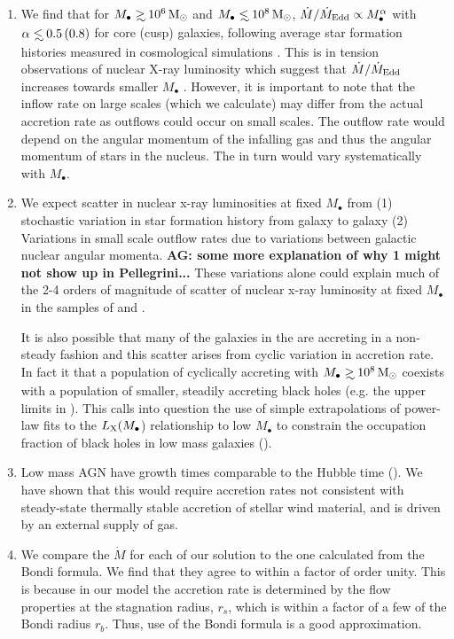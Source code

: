 \documentclass[usenatbib,fleqn]{mn2e}
\newcommand{\Mdot}{\dot{M}}
\newcommand{\eddr}{\dot{M}/\dot{M}_{\rm Edd}}
\newcommand\lsim{\mathrel{\rlap{\lower4pt\hbox{\hskip1pt$\sim$}}
    \raise1pt\hbox{$<$}}}
\newcommand\gsim{\mathrel{\rlap{\lower4pt\hbox{\hskip1pt$\sim$}}
    \raise1pt\hbox{$>$}}}
\newcommand{\rs}{r_s}
\newcommand{\rb}{r_b}
\newcommand{\Mbh}[1][]{M_{\bullet#1}}
\begin{document}
\begin{enumerate}
  \item We find that for $\Mbh\gsim 10^6 \Msun$ and $\Mbh\lsim 10^8
    \Msun$, $\eddr \propto \Mbh^{\alpha}$ with $\alpha\lsim
    0.5 \, (0.8)$ for core (cusp) galaxies, 
    following average star formation histories measured in
    cosmological simulations \citep{MosterNaab+:2013a}. This is in
    tension observations of nuclear X-ray luminosity which suggest
    that $\eddr$ increases towards smaller $\Mbh$
    \citep{Miller+15}. However, it is important to note that the
    inflow rate on large scales (which we calculate) may differ from
    the actual accretion rate as outflows could occur on small
    scales. The outflow rate would depend on the angular momentum of
    the infalling gas and thus the angular momentum of stars in the
    nucleus. The in turn would vary systematically with $\Mbh$.
  \item We expect scatter in nuclear x-ray luminosities at
    fixed $\Mbh$ from (1) stochastic variation in star formation
    history from galaxy to galaxy (2) Variations in small scale outflow
    rates due to variations between galactic nuclear angular
    momenta. {\bf AG: some more explanation of why 1 might not show up
    in Pellegrini...}
    These variations alone could explain much of the 2-4 orders of
    magnitude of scatter of nuclear x-ray luminosity at fixed $\Mbh$ 
    in the samples of \citet{Miller+15} and \citet{Pellegrini:2010a}.
    
    It is also possible that many of the galaxies in the
    \citet{Miller+15} are accreting in a non-steady fashion and this
    scatter arises from cyclic variation in accretion rate. In fact it
    that a population of cyclically accreting with $\Mbh\gsim 10^{8}
    \Msun$ coexists with a population of smaller, steadily accreting
    black holes (e.g. the upper limits in \citet{Miller+15}).  This
    calls into question the use of simple extrapolations of power-law
    fits to the $L_{\rm X}(M_{\bullet}$) relationship to low $M_{\bullet}$
    to constrain the occupation fraction of black holes in low mass
    galaxies (\citealt{Miller+15}).
  \item Low mass AGN have growth times comparable to the Hubble time
    (\citet{Heckman+04}). We have shown that this would require accretion
    rates not consistent with steady-state thermally stable accretion
    of stellar wind material, and is driven by an external supply of gas.
  \item We compare the $\Mdot$ for each of our solution to the one
    calculated from the Bondi formula. We find that they agree to
    within a factor of order unity. This is because in our model the
    accretion rate is determined by the flow properties at the
    stagnation radius, $\rs$, which is within a factor of a few of the
    Bondi radius $\rb$. Thus, use of the Bondi formula is a
    good approximation.
    \end{enumerate}
   
\end{document}
